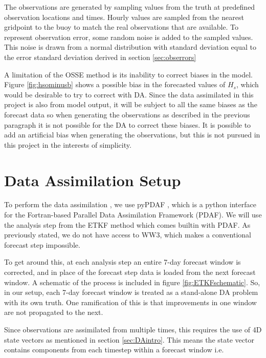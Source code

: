 The observations are generated by sampling values from the truth at predefined observation locations and times. Hourly values are sampled from the nearest gridpoint to the buoy to match the real observations that are available. To represent observation error, some random noise is added to the sampled values. This noise is drawn from a normal distribution with standard deviation equal to the error standard deviation derived in section \ref{sec:obserrors}

A limitation of the OSSE method is its inability to correct biases in the model. Figure \ref{fig:hsominusb} shows a possible bias in the forecasted values of $H_s$, which would be desirable to try to correct with DA. Since the data assimilated in this project is also from model output, it will be subject to all the same biases as the forecast data so when generating the observations as described in the previous paragraph it is not possible for the DA to correct these biases. It is possible to add an artificial bias when generating the observations, but this is not pursued in this project in the interests of simplicity.


\section{Data Assimilation Setup}
\label{sec:DAsetup}

To perform the data assimilation , we use pyPDAF \citep{Chen2024}, which is a python interface for the 
Fortran-based Parallel Data Assimilation Framework (PDAF). We will use the analysis step from the ETKF method which comes builtin with PDAF. As previously stated, we do not have access to WW3, which makes a conventional forecast step impossible.

To get around this, at each analysis step an entire 7-day forecast window is corrected, and in place of the forecast step data is loaded from the next forecast window. A schematic of the process is included in figure \ref{fig:ETKFschematic}. So, in our setup, each 7-day forecast window is treated as a stand-alone DA problem with its own truth. One ramification of this is that improvements in one window are not propagated to the next.

Since observations are assimilated from multiple times, this requires the use of 4D state vectors as mentioned in section \ref{sec:DAintro}. This means the state vector contains components from each timestep within a forecast window i.e. 

